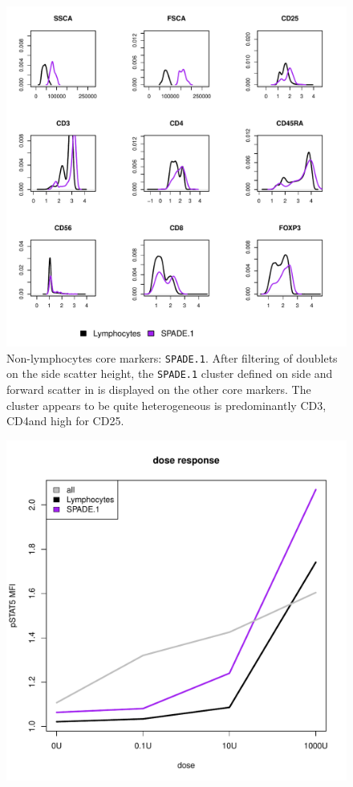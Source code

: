 \begin{figure}
  \centering
\begin{minipage}{.9\textwidth}
\includegraphics[width=\linewidth]{figures/spade-nonlymphocytes-clusters}
{ Non-lymphocytes core markers: \texttt{SPADE.1}.  }
{
After filtering of doublets on the side scatter height, the \texttt{SPADE.1} cluster defined on side and forward scatter in  is displayed on the other core markers.
The cluster appears to be quite heterogeneous is predominantly CD3\positive, CD4\positive and high for CD25.
} 
\end{minipage}
%
\begin{minipage}{.5\textwidth}
  \includegraphics[width=\linewidth]{figures/spade-nonlymphocytes-dose-response}

\end{minipage}
\end{figure}
